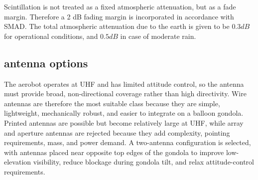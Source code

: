 \medskip
\medskip
\noindent Scintillation is not treated as a fixed atmospheric attenuation, but as a fade margin. 
Therefore a 2 dB fading margin is incorporated in accordance with SMAD\cite{wertz1999smad}.
The total atmospheric attenuation due to the earth is given to be $0.3dB$ for operational conditions, and $0.5 dB$ in case of moderate rain\cite{brizzolari2024dsa4attenuation}. 
\subsection{antenna options}

The aerobot operates at UHF and has limited attitude control, so the antenna must provide broad, non-directional coverage rather than high directivity. Wire antennas are therefore the most suitable class because they are simple, lightweight, mechanically robust, and easier to integrate on a balloon gondola. Printed antennas are possible but become relatively large at UHF, while array and aperture antennas are rejected because they add complexity, pointing requirements, mass, and power demand. A two-antenna configuration is selected, with antennas placed near opposite top edges of the gondola to improve low-elevation visibility, reduce blockage during gondola tilt, and relax attitude-control requirements.

